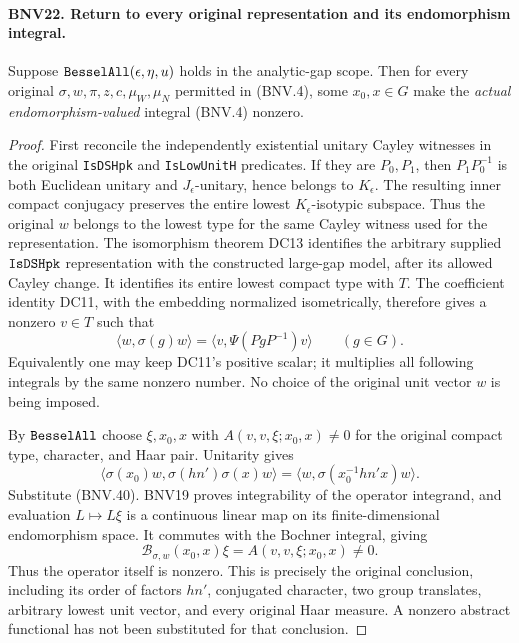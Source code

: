 \documentclass[11pt,a4paper]{article}
\numberwithin{equation}{section}
\theoremstyle{remark}\newtheorem{remark}[theorem]{Remark}
\begin{document}
\paragraph{BNV22. Return to every original representation and its endomorphism integral.}
\label{claim:BNV22}
Suppose $\texttt{Bessel\allowbreak All}(\epsilon,\eta,u)$ holds in the analytic-gap
scope.  Then for every original $\sigma,w,\pi,z,c,\mu_W,\mu_N$ permitted
in (BNV.4), some $x_0,x\in G$ make the \emph{actual endomorphism-valued}
integral (BNV.4) nonzero.

\begin{proof}
First reconcile the independently existential unitary Cayley witnesses
in the original \texttt{Is\allowbreak DSHpk} and \texttt{Is\allowbreak Low\allowbreak Unit\allowbreak H} predicates.
If they are $P_0,P_1$, then $P_1P_0^{-1}$ is both Euclidean unitary
and $J_\epsilon$-unitary, hence belongs to $K_\epsilon$.
The resulting inner compact conjugacy preserves the entire lowest
$K_\epsilon$-isotypic subspace.  Thus the original $w$ belongs to the
lowest type for the same Cayley witness used for the representation.
The isomorphism theorem DC13 identifies the arbitrary supplied
$\texttt{Is\allowbreak DSHpk}$ representation with the constructed large-gap model,
after its allowed Cayley change.  It identifies its entire lowest
compact type with $T$.  The coefficient identity DC11, with the
embedding normalized isometrically, therefore gives a nonzero $v\in T$
such that
\[
 \langle w,\sigma(g)w\rangle
       =\langle v,\Psi(PgP^{-1})v\rangle\qquad(g\in G).
 \tag{BNV.40}
\]
Equivalently one may keep DC11's positive scalar; it multiplies all
following integrals by the same nonzero number.  No choice of the
original unit vector $w$ is being imposed.

By $\texttt{Bessel\allowbreak All}$ choose $\xi,x_0,x$ with
$A(v,v,\xi;x_0,x)\ne0$ for the original compact type, character, and
Haar pair.  Unitarity gives
\[
 \langle\sigma(x_0)w,\sigma(hn')\sigma(x)w\rangle
 =\langle w,\sigma(x_0^{-1}hn'x)w\rangle.
\]
Substitute (BNV.40).  BNV19 proves integrability of the operator
integrand, and evaluation $L\mapsto L\xi$ is a continuous linear map
on its finite-dimensional endomorphism space.  It commutes with the
Bochner integral, giving
\[
 \mathcal B_{\sigma,w}(x_0,x)\xi=A(v,v,\xi;x_0,x)\ne0.
\]
Thus the operator itself is nonzero.  This is precisely the original
conclusion, including its order of factors $hn'$, conjugated character,
two group translates, arbitrary lowest unit vector, and every original
Haar measure.  A nonzero abstract functional has not been substituted
for that conclusion.
\end{proof}
\end{document}
